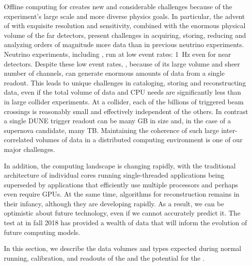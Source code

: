 Offline computing for   creates new and considerable challenges because of the experiment's large scale and more diverse physics goals.  In particular, the advent of  with exquisite resolution and sensitivity, combined with the enormous physical volume of the  far detectors, present challenges in acquiring, storing, reducing and analyzing orders of magnitude more  data than in previous neutrino experiments. %
Neutrino experiments, including , run at low event rates: \SI{1}{Hz} even for near detectors. %
Despite these low event rates, , because of its large volume and sheer number of channels, can generate enormous amounts of data from a single readout.
This leads to unique challenges in cataloging,  storing and reconstructing data, even if the total volume of data and CPU needs are significantly less than in large collider experiments.  At a collider, each of the billions of triggered beam crossings is reasonably small and  effectively independent of the others. In contrast a single DUNE trigger readout can be many GB in size and, in the case of a supernova candidate, many TB. Maintaining the coherence of such large inter-correlated volumes of data in a distributed computing environment is one of our major challenges. 

In addition, the computing landscape is changing rapidly, with the traditional  architecture of individual cores running single-threaded applications being superseded by applications that efficiently use multiple processors and perhaps even require GPUs. At the same time,  algorithms for  reconstruction remains in their infancy, although they are developing rapidly.  As a result, we can be optimistic about future technology, even if we cannot accurately predict it.  The  test at  in fall 2018 has provided a wealth of data that will inform the evolution of future  computing models.

In this section, we describe the data volumes and types expected during normal running, calibration, and  readouts of the  and the potential for the . 


